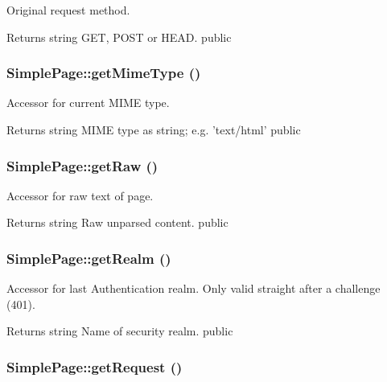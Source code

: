 \label{class_simple_page_a315e80110ab689b07804a4cf93b019d3}
Original request method. \begin{DoxyReturn}{Returns}
string GET, POST or HEAD.  public 
\end{DoxyReturn}
\hypertarget{class_simple_page_ab45c7a21fad8a86bc92cf1c425d7aad9}{
\subsubsection[{getMimeType}]{\setlength{\rightskip}{0pt plus 5cm}SimplePage::getMimeType ()}}
\label{class_simple_page_ab45c7a21fad8a86bc92cf1c425d7aad9}
Accessor for current MIME type. \begin{DoxyReturn}{Returns}
string MIME type as string; e.g. 'text/html'  public 
\end{DoxyReturn}
\hypertarget{class_simple_page_a8a1e675f1751caf54c0f402cf16f1788}{
\subsubsection[{getRaw}]{\setlength{\rightskip}{0pt plus 5cm}SimplePage::getRaw ()}}
\label{class_simple_page_a8a1e675f1751caf54c0f402cf16f1788}
Accessor for raw text of page. \begin{DoxyReturn}{Returns}
string Raw unparsed content.  public 
\end{DoxyReturn}
\hypertarget{class_simple_page_a2805bd95c0dca213fd14f7dd96584616}{
\subsubsection[{getRealm}]{\setlength{\rightskip}{0pt plus 5cm}SimplePage::getRealm ()}}
\label{class_simple_page_a2805bd95c0dca213fd14f7dd96584616}
Accessor for last Authentication realm. Only valid straight after a challenge (401). \begin{DoxyReturn}{Returns}
string Name of security realm.  public 
\end{DoxyReturn}
\hypertarget{class_simple_page_a49e5532c77f862e152c7783d513b61f7}{
\subsubsection[{getRequest}]{\setlength{\rightskip}{0pt plus 5cm}SimplePage::getRequest ()}}
